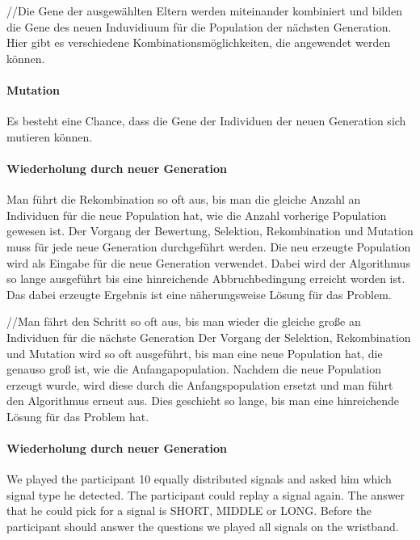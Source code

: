 //Die Gene der ausgew{\"a}hlten Eltern werden miteinander kombiniert und bilden die Gene des neuen Induvidiuum f{\"u}r die Population der n{\"a}chsten Generation. Hier gibt es verschiedene Kombinationsm{\"o}glichkeiten, die angewendet werden k{\"o}nnen.

\paragraph*{Mutation}
Es besteht eine Chance, dass die Gene der Individuen der neuen Generation sich mutieren k{\"o}nnen. 

\paragraph*{Wiederholung durch neuer Generation}

Man f{\"u}hrt die Rekombination so oft aus, bis man die gleiche Anzahl an Individuen f{\"u}r die neue Population hat, wie die Anzahl vorherige Population gewesen ist. 
Der Vorgang der Bewertung, Selektion, Rekombination und Mutation muss f{\"u}r jede neue Generation durchgef{\"u}hrt werden. 
Die neu erzeugte Population wird als Eingabe f{\"u}r die neue Generation verwendet. 
Dabei wird der Algorithmus so lange ausgef{\"u}hrt bis eine hinreichende Abbruchbedingung erreicht worden ist. 
Das dabei erzeugte Ergebnis ist eine n{\"a}herungsweise L{\"o}sung f{\"u}r das Problem.

//Man f{\"a}hrt den Schritt so oft aus, bis man wieder die gleiche gro{\ss}e an Individuen f{\"u}r die n{\"a}chste Generation 
Der Vorgang der Selektion, Rekombination und Mutation wird so oft ausgef{\"u}hrt, bis man eine neue Population hat, die genauso gro{\ss} ist, wie die Anfangapopulation.
Nachdem die neue Population erzeugt wurde, wird diese durch die Anfangspopulation ersetzt und man f{\"u}hrt den Algorithmus erneut aus. 
Dies geschieht so lange, bis man eine hinreichende L{\"o}sung f{\"u}r das Problem hat. 

\paragraph*{Wiederholung durch neuer Generation}

We played the participant 10 equally distributed signals and asked him which signal type he detected.  The participant could replay a signal again. The answer that he could pick for a signal is SHORT, MIDDLE or LONG.
Before the participant should answer the questions we played all signals on the wristband. 

